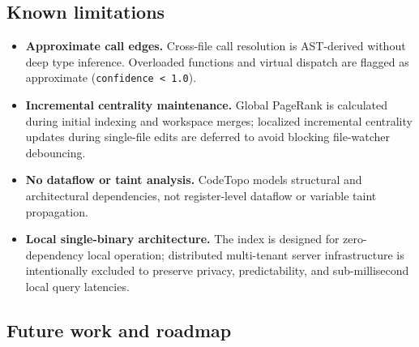 \subsection{Known limitations}

\begin{itemize}
  \item \textbf{Approximate call edges.} Cross-file call resolution is AST-derived without
        deep type inference. Overloaded functions and virtual dispatch are flagged as approximate
        (\texttt{confidence < 1.0}).
  \item \textbf{Incremental centrality maintenance.} Global PageRank is calculated during initial
        indexing and workspace merges; localized incremental centrality updates during single-file
        edits are deferred to avoid blocking file-watcher debouncing.
  \item \textbf{No dataflow or taint analysis.} CodeTopo models structural and architectural
        dependencies, not register-level dataflow or variable taint propagation.
  \item \textbf{Local single-binary architecture.} The index is designed for zero-dependency local
        operation; distributed multi-tenant server infrastructure is intentionally excluded to
        preserve privacy, predictability, and sub-millisecond local query latencies.
\end{itemize}

\subsection{Future work and roadmap}


